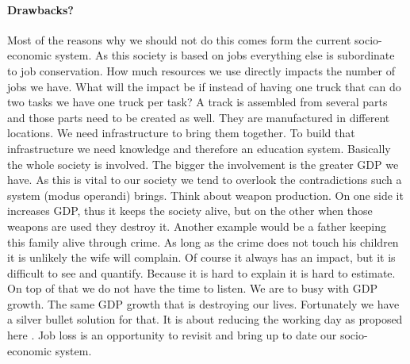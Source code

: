 \documentclass{article}
\begin{document}
\paragraph{Drawbacks?}
Most of the reasons why we should not do this comes form the current socio-economic system.
As this society is based on jobs everything else is subordinate to job conservation.
How much resources we use directly impacts the number of jobs we have.
What will the impact be if instead of having one truck that can do two tasks we have one truck per task?
A track is assembled from several parts and those parts need to be created as well. 
They are manufactured in different locations.
We need infrastructure to bring them together.
To build that infrastructure we need knowledge and therefore an education system.
Basically the whole society is involved.
The bigger the involvement is the greater GDP we have.
As this is vital to our society we tend to overlook the contradictions such a system (modus operandi) brings.
Think about weapon production.
On one side it increases GDP, thus it keeps the society alive, but on the other when those weapons are used they destroy it.
Another example would be a father keeping this family alive through crime.
As long as the crime does not touch his children it is unlikely the wife will complain.
Of course it always has an impact, but it is difficult to see and quantify.
Because it is hard to explain it is hard to estimate.
On top of that we do not have the time to listen.
We are to busy with GDP growth.
The same GDP growth that is destroying our lives.
Fortunately we have a silver bullet solution for that.
It is about reducing the working day as proposed here \cite{4hourday}\cite{distributed_jobs}.
Job loss is an opportunity to revisit and bring up to date our socio-economic system.
\newpage


\end{document}
